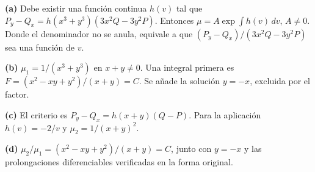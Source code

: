 \noindent\textbf{(a)} Debe existir una función continua $h(v)$ tal que $P_y-Q_x=h(x^3+y^3)(3x^2Q-3y^2P)$. Entonces $\mu=A\exp\!\int h(v)\,dv$, $A\ne0$. Donde el denominador no se anula, equivale a que $(P_y-Q_x)/(3x^2Q-3y^2P)$ sea una función de $v$.

\noindent\textbf{(b)} $\mu_1=1/(x^3+y^3)$ en $x+y\ne0$. Una integral primera es $F=(x^2-xy+y^2)/(x+y)=C$. Se añade la solución $y=-x$, excluida por el factor.

\noindent\textbf{(c)} El criterio es $P_y-Q_x=h(x+y)(Q-P)$. Para la aplicación $h(v)=-2/v$ y $\mu_2=1/(x+y)^2$.

\noindent\textbf{(d)} $\mu_2/\mu_1=(x^2-xy+y^2)/(x+y)=C$, junto con $y=-x$ y las prolongaciones diferenciables verificadas en la forma original.
